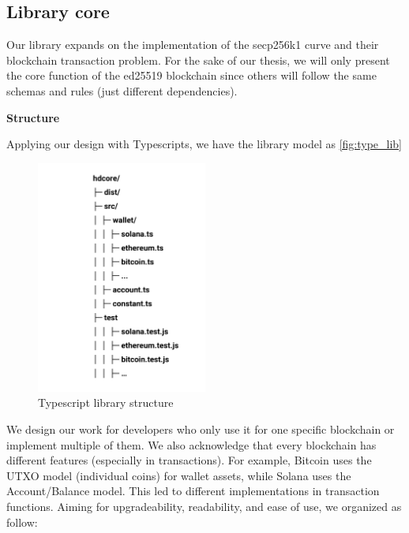 \subsection{Library core}
Our library expands on the implementation of the secp256k1 curve and their blockchain transaction problem. For the sake of our thesis, we will only present the core function of the ed25519 blockchain since others will follow the same schemas and rules (just different dependencies).

\bigskip
{\textbf{Structure}}

Applying our design with Typescripts, we have the library model as \autoref{fig:type_lib}

\begin{figure}[ht!]
    \centering
    \includegraphics[width=0.5\textwidth]{images/lib_typescript.png}
    \caption[Typescript library structure]{Typescript library structure}
    \label{fig:type_lib}
\end{figure}

We design our work for developers who only use it for one specific blockchain or implement multiple of them. We also acknowledge that every blockchain has different features (especially in transactions). For example, Bitcoin uses the UTXO model (individual coins) for wallet assets, while Solana uses the Account/Balance model. This led to different implementations in transaction functions. Aiming for upgradeability, readability, and ease of use, we organized as follow:


